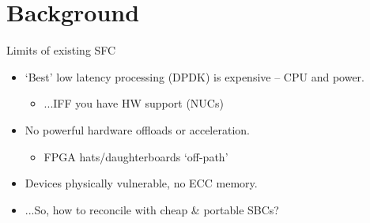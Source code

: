 \documentclass[aspectratio=169,xcolor={dvipsnames}
,handout
]{beamer}
\begin{document}
\section{Background}

\begin{frame}{Limits of existing SFC}
	\begin{itemize}
		\item `Best' low latency processing (DPDK) is \alert{expensive} -- CPU and power.
		\begin{itemize}
			\item ...IFF you have HW support (NUCs)
		\end{itemize}
		\item No powerful hardware offloads or acceleration.
		\begin{itemize}
			\item FPGA hats/daughterboards \alert{`off-path'}
		\end{itemize}
		\item Devices physically vulnerable, \alert{no ECC memory}.
		\item ...So, how to reconcile with cheap \& portable SBCs?
	\end{itemize}
\end{frame}

\end{document}
